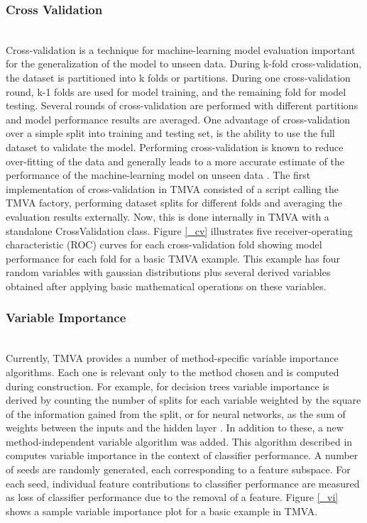 \documentclass[a4paper]{jpconf}
\begin{document}
\subsubsection{Cross Validation}\hspace*{\fill} \\ 
Cross-validation is a technique for machine-learning model evaluation important for the generalization of the model to unseen data. During k-fold cross-validation, the dataset is partitioned into k folds or partitions. During one cross-validation round, k-1 folds are used for model training, and the remaining fold for model testing. Several rounds of cross-validation are performed with different partitions and model performance results are averaged. One advantage of cross-validation over a simple split into training and testing set, is the ability to use the full dataset to validate the model. Performing cross-validation is known to reduce over-fitting of the data and generally leads to a more accurate estimate of the performance of the machine-learning model on unseen data \cite{arlot2010survey}.\newline\newline 
The first implementation of cross-validation in TMVA consisted of a script calling the TMVA factory, performing dataset splits for different folds and averaging the evaluation results externally. Now, this is done internally in TMVA with a standalone CrossValidation class. Figure \ref{_cv} illustrates five receiver-operating characteristic (ROC) curves for each cross-validation fold showing model performance for each fold for a basic TMVA example. This example has four random variables with gaussian distributions plus several derived variables obtained after applying basic mathematical operations on these variables.

\subsubsection{Variable Importance}\hspace*{\fill} \\
Currently, TMVA provides a number of method-specific variable importance algorithms. Each one is relevant only to the method chosen and is computed during construction. For example, for decision trees variable importance is derived by counting the number of splits for each variable weighted by the square of the information gained from the split,   or for neural networks, as the sum of weights between the inputs and the hidden layer \cite{Hocker:2007ht}.\newline\newline
In addition to these, a new method-independent variable algorithm was added. This algorithm described in\cite{gleyzer2008paradigm} computes variable importance in the context of classifier performance. A number of seeds are randomly generated, each corresponding to a feature subspace. For each seed, individual feature contributions to classifier performance are measured as loss of classifier performance due to the removal of a feature. Figure \ref{_vi} shows a sample variable importance plot for a basic example in TMVA.
\end{document}
